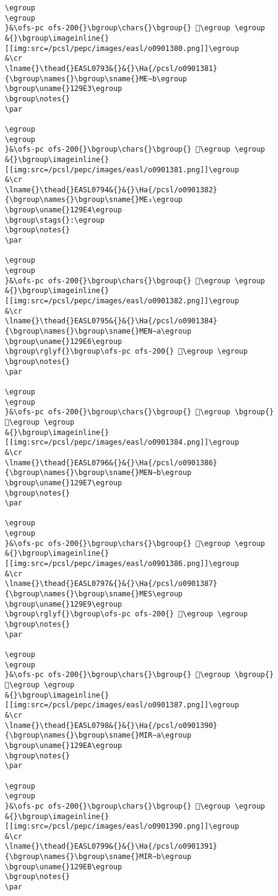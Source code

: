 \begin{verbatim}
\egroup
\egroup
}&\ofs-pc ofs-200{}\bgroup\chars{}\bgroup{} 𒧢\egroup \egroup
&{}\bgroup\imageinline{}[[img:src=/pcsl/pepc/images/easl/o0901380.png]]\egroup
&\cr
\lname{}\thead{}EASL0793&{}&{}\Ha{/pcsl/o0901381}{\bgroup\names{}\bgroup\sname{}ME∼b\egroup
\bgroup\uname{}129E3\egroup
\bgroup\notes{}
\par 

\egroup
\egroup
}&\ofs-pc ofs-200{}\bgroup\chars{}\bgroup{} 𒧣\egroup \egroup
&{}\bgroup\imageinline{}[[img:src=/pcsl/pepc/images/easl/o0901381.png]]\egroup
&\cr
\lname{}\thead{}EASL0794&{}&{}\Ha{/pcsl/o0901382}{\bgroup\names{}\bgroup\sname{}ME₃\egroup
\bgroup\uname{}129E4\egroup
\bgroup\stags{}:\egroup
\bgroup\notes{}
\par 

\egroup
\egroup
}&\ofs-pc ofs-200{}\bgroup\chars{}\bgroup{} 𒧤\egroup \egroup
&{}\bgroup\imageinline{}[[img:src=/pcsl/pepc/images/easl/o0901382.png]]\egroup
&\cr
\lname{}\thead{}EASL0795&{}&{}\Ha{/pcsl/o0901384}{\bgroup\names{}\bgroup\sname{}MEN∼a\egroup
\bgroup\uname{}129E6\egroup
\bgroup\rglyf{}\bgroup\ofs-pc ofs-200{} 𒧦\egroup \egroup
\bgroup\notes{}
\par 

\egroup
\egroup
}&\ofs-pc ofs-200{}\bgroup\chars{}\bgroup{} 𒧥\egroup \bgroup{} 𒧦\egroup \egroup
&{}\bgroup\imageinline{}[[img:src=/pcsl/pepc/images/easl/o0901384.png]]\egroup
&\cr
\lname{}\thead{}EASL0796&{}&{}\Ha{/pcsl/o0901386}{\bgroup\names{}\bgroup\sname{}MEN∼b\egroup
\bgroup\uname{}129E7\egroup
\bgroup\notes{}
\par 

\egroup
\egroup
}&\ofs-pc ofs-200{}\bgroup\chars{}\bgroup{} 𒧧\egroup \egroup
&{}\bgroup\imageinline{}[[img:src=/pcsl/pepc/images/easl/o0901386.png]]\egroup
&\cr
\lname{}\thead{}EASL0797&{}&{}\Ha{/pcsl/o0901387}{\bgroup\names{}\bgroup\sname{}MES\egroup
\bgroup\uname{}129E9\egroup
\bgroup\rglyf{}\bgroup\ofs-pc ofs-200{} 𒧩\egroup \egroup
\bgroup\notes{}
\par 

\egroup
\egroup
}&\ofs-pc ofs-200{}\bgroup\chars{}\bgroup{} 𒧨\egroup \bgroup{} 𒧩\egroup \egroup
&{}\bgroup\imageinline{}[[img:src=/pcsl/pepc/images/easl/o0901387.png]]\egroup
&\cr
\lname{}\thead{}EASL0798&{}&{}\Ha{/pcsl/o0901390}{\bgroup\names{}\bgroup\sname{}MIR∼a\egroup
\bgroup\uname{}129EA\egroup
\bgroup\notes{}
\par 

\egroup
\egroup
}&\ofs-pc ofs-200{}\bgroup\chars{}\bgroup{} 𒧪\egroup \egroup
&{}\bgroup\imageinline{}[[img:src=/pcsl/pepc/images/easl/o0901390.png]]\egroup
&\cr
\lname{}\thead{}EASL0799&{}&{}\Ha{/pcsl/o0901391}{\bgroup\names{}\bgroup\sname{}MIR∼b\egroup
\bgroup\uname{}129EB\egroup
\bgroup\notes{}
\par 


\end{verbatim}

